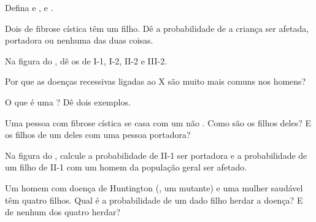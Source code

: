 \begin{exercise}[$\star$]\label{exo:g11:genes-and-disease:1}
Defina   e  , e .
\end{exercise}

\begin{exercise}[$\star$]\label{exo:g11:genes-and-disease:2}
Dois  de fibrose cística têm um filho. Dê a probabilidade de
a criança ser afetada, portadora ou nenhuma das duas coisas.
\end{exercise}

\begin{exercise}[$\star$]\label{exo:g11:genes-and-disease:3}
Na figura do , dê os  de I-1, I-2, II-2 e III-2.
\end{exercise}

\begin{exercise}[$\star$]\label{exo:g11:genes-and-disease:4}
Por que as doenças recessivas ligadas ao X são muito mais comuns nos homens?
\end{exercise}

\begin{exercise}[$\star$]\label{exo:g11:genes-and-disease:5}
O que é uma ? Dê dois exemplos.
\end{exercise}

\begin{exercise}[$\star\star$]\label{exo:g11:genes-and-disease:6}
Uma pessoa com fibrose cística se casa com um não . Como são os
filhos deles? E os filhos de um deles com uma pessoa portadora?
\end{exercise}

\begin{exercise}[$\star\star$]\label{exo:g11:genes-and-disease:7}
Na figura do , calcule a probabilidade de II-1 ser portadora
e a probabilidade de um filho de II-1 com um homem da população geral
ser afetado.
\end{exercise}

\begin{exercise}[$\star\star$]\label{exo:g11:genes-and-disease:8}
Um homem com doença de Huntington (, um  mutante) e uma
mulher saudável têm quatro filhos. Qual é a probabilidade de um dado
filho herdar a doença? E de nenhum dos quatro herdar?
\end{exercise}

